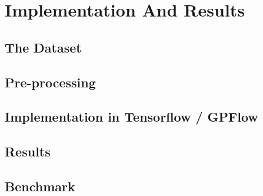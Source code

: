 \chapter{Implementation And Results}
\section{The Dataset}
\section{Pre-processing}
\section{Implementation in Tensorflow / GPFlow}
\section{Results}
\section{Benchmark}